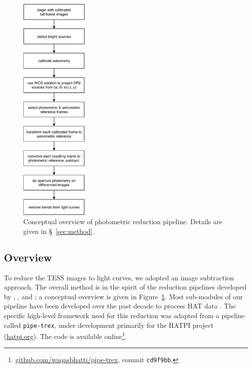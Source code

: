 \documentclass[12pt,twocolumn,tighten]{aastex62}
\begin{document}
\begin{figure}[t]
	\begin{center}
		\leavevmode
		\includegraphics[width=0.3\textwidth]{pipelineoverview.pdf}
	\end{center}
	\vspace{-0.2cm}
	\caption{
    Conceptual overview of photometric reduction pipeline.
    Details are given in \S~\ref{sec:method}.
	\label{fig:pipeline}
	}
\end{figure}

\subsection{Overview}

To reduce the TESS images to light curves, we adopted an image
subtraction approach.  The overall method is in the spirit of the
reduction pipelines developed by \citet{Pal_2009},
\citet{huang_high-precision_2015}, \citet{soares-furtado_image_2017}
and \citet{oelkers_precision_2018}; a conceptual overview is given in
Figure~\ref{fig:pipeline}.  Most sub-modules of our pipeline have been
developed over the past decade to process HAT data \citep[{\it
e.g.},][]{bakos_hat_review_2018}.  The specific high-level framework
used for this reduction was adapted from a pipeline called
\texttt{pipe-trex}, under development primarily for the HATPI project
(\url{hatpi.org}).  The code is available
online\footnote{\url{github.com/waqasbhatti/pipe-trex}, commit
\texttt{cd9f9bb}.}.
\end{document}
